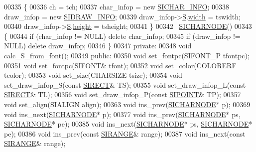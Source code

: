 \begin{DoxyCode}
00335     \{
00336         ch = tch;
00337         char\_infop = \textcolor{keyword}{new} \hyperlink{class_s_i_c_h_a_r___i_n_f_o}{SICHAR\_INFO};
00338         draw\_infop = \textcolor{keyword}{new} \hyperlink{class_s_i_d_r_a_w___i_n_f_o}{SIDRAW\_INFO};
00339         draw\_infop->\hyperlink{class_s_i_d_r_a_w___i_n_f_o_a495fac5bcc54e4b58d500a7117fde9d9}{S}.\hyperlink{struct_s_i_r_e_c_t_a99dbd77d045cc587f0c1f40bbba99ac8}{width} = tswidth;
00340         draw\_infop->\hyperlink{class_s_i_d_r_a_w___i_n_f_o_a495fac5bcc54e4b58d500a7117fde9d9}{S}.\hyperlink{struct_s_i_r_e_c_t_a6577f3092897d4bef17aab5ec4d62819}{height} = tsheight;
00341     \}
00342     ~\hyperlink{class_s_i_c_h_a_r_n_o_d_e}{SICHARNODE}() 
00343     \{
00344         \textcolor{keywordflow}{if} (char\_infop != NULL) \textcolor{keyword}{delete} char\_infop;
00345         \textcolor{keywordflow}{if} (draw\_infop != NULL) \textcolor{keyword}{delete} draw\_infop;
00346     \}
00347 \textcolor{keyword}{private}:
00348     \textcolor{keywordtype}{void} calc\_S\_from\_font();
00349 \textcolor{keyword}{public}:
00350     \textcolor{keywordtype}{void} set\_fontpc(SIFONT\_P tfontpc);  
00351     \textcolor{keywordtype}{void} set\_fontpc(SIFONT& tfont);
00352     \textcolor{keywordtype}{void} set\_color(COLORERF tcolor);
00353     \textcolor{keywordtype}{void} set\_size(CHARSIZE tsize);
00354     \textcolor{keywordtype}{void} set\_draw\_infop\_S(\textcolor{keyword}{const} \hyperlink{struct_s_i_r_e_c_t}{SIRECT}& TS);
00355     \textcolor{keywordtype}{void} set\_draw\_infop\_L(\textcolor{keyword}{const} \hyperlink{struct_s_i_r_e_c_t}{SIRECT}& TL);
00356     \textcolor{keywordtype}{void} set\_draw\_infop\_P(\textcolor{keyword}{const} \hyperlink{struct_s_i_p_o_i_n_t}{SIPOINT}& TP);
00357     \textcolor{keywordtype}{void} set\_align(SIALIGN align);
00363     \textcolor{keywordtype}{void} ins\_prev(\hyperlink{class_s_i_c_h_a_r_n_o_d_e}{SICHARNODE}* p);
00369     \textcolor{keywordtype}{void} ins\_next(\hyperlink{class_s_i_c_h_a_r_n_o_d_e}{SICHARNODE}* p);
00377     \textcolor{keywordtype}{void} ins\_prev(\hyperlink{class_s_i_c_h_a_r_n_o_d_e}{SICHARNODE}* ps, \hyperlink{class_s_i_c_h_a_r_n_o_d_e}{SICHARNODE}* pe);
00385     \textcolor{keywordtype}{void} ins\_next(\hyperlink{class_s_i_c_h_a_r_n_o_d_e}{SICHARNODE}* ps, \hyperlink{class_s_i_c_h_a_r_n_o_d_e}{SICHARNODE}* pe);
00386     \textcolor{keywordtype}{void} ins\_prev(\textcolor{keyword}{const} \hyperlink{struct_s_i_r_a_n_g_e}{SIRANGE}& range); 
00387     \textcolor{keywordtype}{void} ins\_next(\textcolor{keyword}{const} \hyperlink{struct_s_i_r_a_n_g_e}{SIRANGE}& range); 

\end{DoxyCode}
